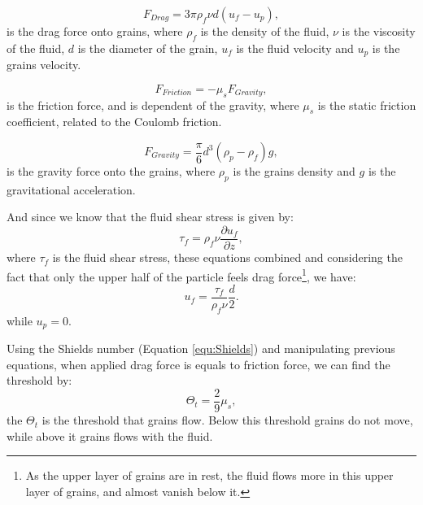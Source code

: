 \begin{equation}
    F_{Drag} = 3\pi \rho_f \nu d\left(u_f-u_p\right),
\end{equation}
is the drag force onto grains, where $\rho_f$ is the density of the fluid, $\nu$ is the viscosity of the fluid, $d$ is the diameter of the grain, $u_f$ is the fluid velocity and $u_p$ is the grains velocity.

\begin{equation}
    F_{Friction} = -\mu_s F_{Gravity},
\end{equation}
is the friction force, and is dependent of the gravity, where $\mu_s$ is the static friction coefficient, related to the Coulomb friction.

\begin{equation}
    F_{Gravity} = \frac{\pi}{6}d^3\left(\rho_p-\rho_f\right)g,
\end{equation}
is the gravity force onto the grains, where $\rho_p$ is the grains density and $g$ is the gravitational acceleration.

    And since we know that the fluid shear stress is given by:
\begin{equation}
    \tau_f = \rho_f \nu \frac{\partial u_f}{\partial z},
\end{equation}
where $\tau_f$ is the fluid shear stress, these equations combined and considering the fact that only the upper half of the particle feels drag force\footnote{As the upper layer of grains are in rest, the fluid flows more in this upper layer of grains, and almost vanish below it.}, we have:
\begin{equation}
    u_f = \frac{\tau_f}{\rho_f\nu}\frac{d}{2}.
\end{equation}
while $u_p = 0$.

    Using the Shields number (Equation \ref{equ:Shields}) and manipulating previous equations, when applied drag force is equals to friction force, we can find the threshold by:
\begin{equation}
    \Theta_t = \frac{2}{9}\mu_s,
\end{equation}
the $\Theta_t$ is the threshold that grains flow. Below this threshold grains do not move, while above it grains flows with the fluid.

